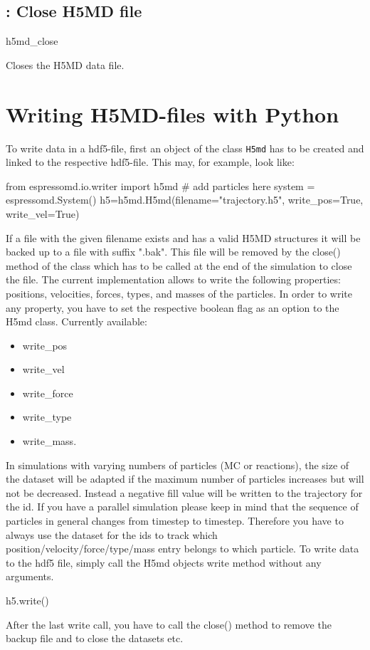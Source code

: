 \subsection{: Close H5MD file}

\begin{essyntax}
h5md_close
\end{essyntax}
Closes the H5MD data file.


\section{Writing H5MD-files with Python}
To write data in a hdf5-file, first an object of the class \texttt{H5md} has to
be created and linked to the respective hdf5-file. This may, for example, look
like:
\begin{pycode}
from espressomd.io.writer import h5md
# add particles here
system = espressomd.System()
h5=h5md.H5md(filename="trajectory.h5", write_pos=True, write_vel=True)
\end{pycode}
If a file with the given filename exists and has a valid H5MD structures it
will be backed up to a file with suffix ".bak". This file will be removed by
the close() method of the class which has to be called at the end of the
simulation to close the file. The current implementation allows to write the
following properties: positions, velocities, forces, types, and masses of the
particles. In order to write any property, you have to set the respective
boolean flag as an option to the H5md class. Currently available:
\begin{itemize}
    \item write_pos
    \item write_vel
    \item write_force
    \item write_type
    \item write_mass.
\end{itemize}
In simulations with varying numbers of particles (MC or reactions), the
size of the dataset will be adapted if the maximum number of particles
increases but will not be decreased. Instead a negative fill value will 
be written to the trajectory for the id. If you have a parallel simulation
please keep in mind that the sequence of particles in general changes
from timestep to timestep. Therefore you have to always use the dataset
for the ids to track which position/velocity/force/type/mass entry belongs
to which particle.
To write data to the hdf5 file, simply call the H5md objects write method
without any arguments.
\begin{pycode}
h5.write()
\end{pycode}
After the last write call, you have to call the close() method to remove
the backup file and to close the datasets etc.
